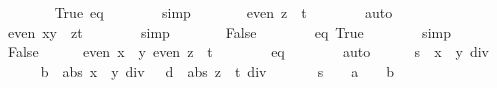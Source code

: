 \begin{isabellebody}
\ \ \ \ \ \ \isamarkupfalse%
\ True\ eq{\isacharparenleft}{}{\isacharparenright}\isanewline
\ \ \ \ \ \ \isamarkupfalse%
\ simp\isanewline
\ \ \ \ \isamarkupfalse%
\ \isamarkupfalse%
\ {\isachardoublequoteopen}even\ {\isacharparenleft}z\ {\isacharasterisk}\ t{\isacharparenright}{\isachardoublequoteclose}\isanewline
\ \ \ \ \ \ \isamarkupfalse%
\ auto\isanewline
\isanewline
\ \ \ \ \isamarkupfalse%
\isanewline
\isanewline
\ \ \ \ \isamarkupfalse%
\ {\isachardoublequoteopen}even\ {\isacharparenleft}x{\isacharasterisk}y\ {\isacharminus}\ z{\isacharasterisk}t{\isacharparenright}{\isachardoublequoteclose}\isanewline
\ \ \ \ \ \ \isamarkupfalse%
\ simp\isanewline
\ \ \ \ \isamarkupfalse%
\ \isamarkupfalse%
\ False\isanewline
\ \ \ \ \ \ \isamarkupfalse%
\ eq{\isacharparenleft}{}{\isacharparenright}\ True\isanewline
\ \ \ \ \ \ \isamarkupfalse%
\ simp\isanewline
\ \ \isamarkupfalse%
\isanewline
\ \ \ \ \isamarkupfalse%
\ False\isanewline
\ \ \ \ \isamarkupfalse%
\ {\isachardoublequoteopen}even\ {\isacharparenleft}x\ {\isacharplus}\ y{\isacharparenright}{\isachardoublequoteclose}\ {\isachardoublequoteopen}even\ {\isacharparenleft}z\ {\isacharplus}\ t{\isacharparenright}{\isachardoublequoteclose}\isanewline
\ \ \ \ \ \ \isamarkupfalse%
\ eq{\isacharparenleft}{}{\isacharparenright}\isanewline
\ \ \ \ \ \ \isamarkupfalse%
\ auto\isanewline
\isanewline
\ \ \ \ \isamarkupfalse%
\ {\isacharquery}s\ {\isacharequal}\ {\isachardoublequoteopen}{\isacharparenleft}x\ {\isacharplus}\ y{\isacharparenright}\ div\ {}{\isachardoublequoteclose}\isanewline
\ \ \ \ \isamarkupfalse%
\ {\isacharquery}b\ {\isacharequal}\ {\isachardoublequoteopen}abs\ {\isacharparenleft}x\ {\isacharminus}\ y{\isacharparenright}\ div\ {}{\isachardoublequoteclose}\ \ {\isacharquery}d\ {\isacharequal}\ {\isachardoublequoteopen}abs\ {\isacharparenleft}z\ {\isacharminus}\ t{\isacharparenright}\ div\ {}{\isachardoublequoteclose}\isanewline
\isanewline
\ \ \ \ \isamarkupfalse%
\ {\isachardoublequoteopen}{\isacharquery}s\ {\isacharcircum}\ {}\ {\isacharequal}\ a\ {\isacharcircum}\ {}\ {\isacharplus}\ {\isacharquery}b\ {\isacharcircum}\ {}{\isachardoublequoteclose}\isanewline

\end{isabellebody}
